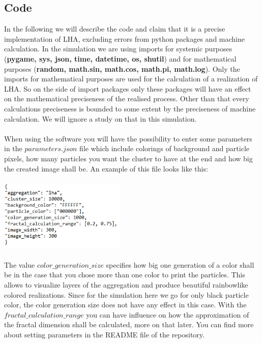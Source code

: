 \documentclass[12pt,a4paper]{scrartcl}
\numberwithin{equation}{subsection}
\newcommand{\1}{\mathbbm{1}}
\numberwithin{equation}{section}
\theoremstyle{definition}
\begin{document}
\subsection{Code}
In the following we will describe the code and claim that it is a precise implementation of LHA, excluding errors from python packages and machine calculation. In the simulation we are using imports for systemic purposes (\textbf{pygame, sys, json, time, datetime, os, shutil}) and for mathematical purposes (\textbf{random, math.sin, math.cos, math.pi, math.log}). Only the imports for mathematical purposes are used for the calculation of a realization of LHA. So on the side of import packages only these packages will have an effect on the mathematical preciseness of the realised process. Other than that every calculations preciseness is bounded to some extent by the preciseness of machine calculation. We will ignore a study on that in this simulation. \\
\\When using the software you will have the possibility to enter some parameters in the $\mathit{parameters.json}$ file which include colorings of background and particle pixels, how many particles you want the cluster to have at the end and how big the created image shall be. An example of this file looks like this:\\
\\
\includegraphics[height=3.33cm]{images/code-snippets/parameters.png} \\
\\
The value $\mathit{color\_generation\_size}$ specifies how big one generation of a color shall be in the case that you chose more than one color to print the particles. This allows to visualize layers of the aggregation and produce beautiful rainbowlike colored realizations. Since for the simulation here we go for only black particle color, the color generation size does not have any effect in this case. With the $\mathit{fractal\_calculation\_range}$ you can have influence on how the approximation of the fractal dimension shall be calculated, more on that later. You can find more about setting parameters in the README file of the repository. \\
\end{document}

